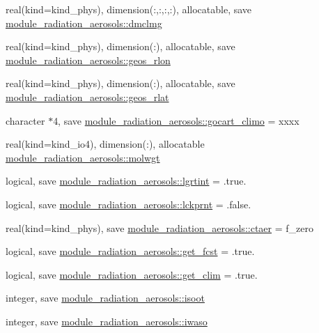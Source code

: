 \begin{DoxyCompactItemize}
\item 
real(kind=kind\+\_\+phys), dimension(\+:,\+:,\+:,\+:), allocatable, save \hyperlink{namespacemodule__radiation__aerosols_a123d552c7f98f7371565f4e2017efd45}{module\+\_\+radiation\+\_\+aerosols\+::dmclmg}
\item 
real(kind=kind\+\_\+phys), dimension(\+:), allocatable, save \hyperlink{namespacemodule__radiation__aerosols_a1a0e35ab33517e765898870b8b1ab1ad}{module\+\_\+radiation\+\_\+aerosols\+::geos\+\_\+rlon}
\item 
real(kind=kind\+\_\+phys), dimension(\+:), allocatable, save \hyperlink{namespacemodule__radiation__aerosols_aef43bfbd28ef9b87e8d6973ba7331a18}{module\+\_\+radiation\+\_\+aerosols\+::geos\+\_\+rlat}
\item 
character $\ast$4, save \hyperlink{namespacemodule__radiation__aerosols_ab8118108e60a4795a8caa5af71232399}{module\+\_\+radiation\+\_\+aerosols\+::gocart\+\_\+climo} = \textquotesingle{}xxxx\textquotesingle{}
\item 
real(kind=kind\+\_\+io4), dimension(\+:), allocatable \hyperlink{namespacemodule__radiation__aerosols_a166e63abaa518ec795f8eea6d115f03c}{module\+\_\+radiation\+\_\+aerosols\+::molwgt}
\item 
logical, save \hyperlink{namespacemodule__radiation__aerosols_aa27bf6912bfd67b78381892d4f555c51}{module\+\_\+radiation\+\_\+aerosols\+::lgrtint} = .true.
\item 
logical, save \hyperlink{namespacemodule__radiation__aerosols_a018d5414597049069c1ddd1094285371}{module\+\_\+radiation\+\_\+aerosols\+::lckprnt} = .false.
\item 
real(kind=kind\+\_\+phys), save \hyperlink{namespacemodule__radiation__aerosols_a4b0aa142aee31c40361dadc390ccc68e}{module\+\_\+radiation\+\_\+aerosols\+::ctaer} = f\+\_\+zero
\item 
logical, save \hyperlink{namespacemodule__radiation__aerosols_a36f851e49de5e1f7da38da5fa6ea445c}{module\+\_\+radiation\+\_\+aerosols\+::get\+\_\+fcst} = .true.
\item 
logical, save \hyperlink{namespacemodule__radiation__aerosols_a7fe1943010fe47c9d86ef4c993848459}{module\+\_\+radiation\+\_\+aerosols\+::get\+\_\+clim} = .true.
\item 
integer, save \hyperlink{namespacemodule__radiation__aerosols_aa9aa876f65d1e1e971607bff4ffbddad}{module\+\_\+radiation\+\_\+aerosols\+::isoot}
\item 
integer, save \hyperlink{namespacemodule__radiation__aerosols_ad15292f4a185c28ad44687d95ef4d3a4}{module\+\_\+radiation\+\_\+aerosols\+::iwaso}

\end{DoxyCompactItemize}
